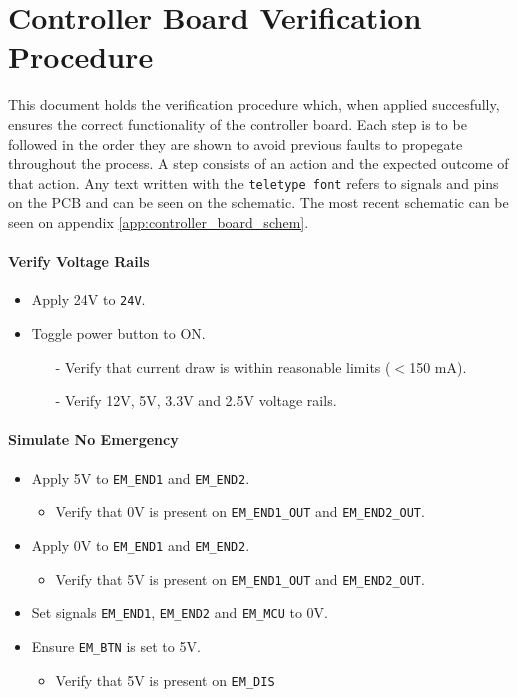 \section{Controller Board Verification Procedure} %
\label{sec:controller_board_verification_procedure}
This document holds the verification procedure which, when applied succesfully, ensures the correct functionality of the controller board.
Each step is to be followed in the order they are shown to avoid previous faults to propegate throughout the process.
A step consists of an action and the expected outcome of that action.
Any text written with the \texttt{teletype font} refers to signals and pins on the PCB and can be seen on the schematic.
The most recent schematic can be seen on appendix \ref{app:controller_board_schem}.
\paragraph{Verify Voltage Rails} %
 \begin{itemize}
 	\item Apply 24V to \texttt{24V}.
 	\item Toggle power button to ON.
 	\begin{itemize}
 		\item[-] Verify that current draw is within reasonable limits ($<$150 mA).
 		\item[-] Verify 12V, 5V, 3.3V and 2.5V voltage rails.
 	\end{itemize}
 \end{itemize}

\paragraph{Simulate No Emergency} %
\begin{itemize}
	\item Apply 5V to \texttt{EM\_END1} and \texttt{EM\_END2}.
	\begin{itemize}
		\item Verify that 0V is present on \texttt{EM\_END1\_OUT} and \texttt{EM\_END2\_OUT}.
	\end{itemize}
	\item Apply 0V to \texttt{EM\_END1} and \texttt{EM\_END2}.
	\begin{itemize}
		\item Verify that 5V is present on \texttt{EM\_END1\_OUT} and \texttt{EM\_END2\_OUT}.
	\end{itemize}
	\item Set signals \texttt{EM\_END1}, \texttt{EM\_END2} and \texttt{EM\_MCU} to 0V.
	\item Ensure \texttt{EM\_BTN} is set to 5V.
	\begin{itemize}
		\item Verify that 5V is present on \texttt{EM\_DIS}
	\end{itemize}
\end{itemize}
